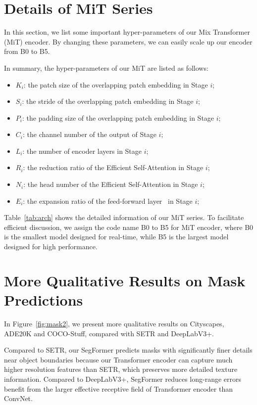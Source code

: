 \clearpage
\appendix

\section{Details of MiT Series}
In this section, we list some important hyper-parameters of our Mix Transformer (MiT) encoder. By changing these parameters, we can easily scale up our encoder from B0 to B5.

In summary, the hyper-parameters of our MiT are listed as follows:
\begin{itemize}
	\item $K_i$: the patch size of the overlapping patch embedding in Stage $i$;
	\item $S_i$: the stride of the overlapping patch embedding in Stage $i$;
	\item $P_i$: the padding size of the overlapping patch embedding in Stage $i$;
	\item $C_i$: the channel number of the output of Stage $i$;
	\item $L_i$: the number of encoder layers in Stage $i$;
	\item $R_i$: the reduction ratio of the Efficient Self-Attention in Stage $i$;
	\item $N_i$: the head number of the Efficient Self-Attention in Stage $i$;
	\item $E_i$: the expansion ratio of the feed-forward layer~\cite{vaswani2017attention} in Stage $i$;
\end{itemize}

Table~\ref{tab:arch} shows the detailed information of our MiT series. 
To facilitate efficient discussion, we assign the code name B0 to B5 for MiT encoder, where B0 is the smallest model designed for real-time, while B5 is the largest model designed for high performance.

\section{More Qualitative Results on Mask Predictions}
In Figure~\ref{fig:mask2}, we present more qualitative results on Cityscapes, ADE20K and COCO-Stuff, compared with SETR and DeepLabV3+. 

Compared to SETR, our SegFormer predicts masks with significantly finer details near object boundaries because our Transformer encoder can capture much higher resolution features than SETR, which preserves more detailed texture information.
Compared to DeepLabV3+, SegFormer reduces long-range errors benefit from the larger effective receptive field of Transformer encoder than ConvNet.

